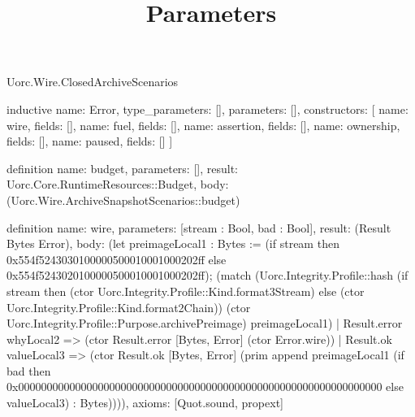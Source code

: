 \begin{lexlean}{Uorc.Wire.ClosedArchiveScenarios}
\title{Parameters}
\begin{semanticmodule}
inductive{
  name: Error,
  type_parameters: [],
  parameters: [],
  constructors: [
    {name: wire, fields: []},
    {name: fuel, fields: []},
    {name: assertion, fields: []},
    {name: ownership, fields: []},
    {name: paused, fields: []}
  ]
}

definition{
  name: budget,
  parameters: [],
  result: Uorc.Core.RuntimeResources::Budget,
  body: (Uorc.Wire.ArchiveSnapshotScenarios::budget)
}

definition{
  name: wire,
  parameters: [stream : Bool, bad : Bool],
  result: (Result Bytes Error),
  body: (let preimageLocal1 : Bytes := (if stream then 0x554f5243030100000500010001000202ff else 0x554f5243020100000500010001000202ff); (match (Uorc.Integrity.Profile::hash (if stream then (ctor Uorc.Integrity.Profile::Kind.format3Stream) else (ctor Uorc.Integrity.Profile::Kind.format2Chain)) (ctor Uorc.Integrity.Profile::Purpose.archivePreimage) preimageLocal1)
    | Result.error whyLocal2 => (ctor Result.error [Bytes, Error] (ctor Error.wire))
    | Result.ok valueLocal3 => (ctor Result.ok [Bytes, Error] (prim append preimageLocal1 (if bad then 0x0000000000000000000000000000000000000000000000000000000000000000 else valueLocal3) : Bytes)))),
  axioms: [Quot.sound, propext]
}


\end{semanticmodule}
\end{lexlean}
